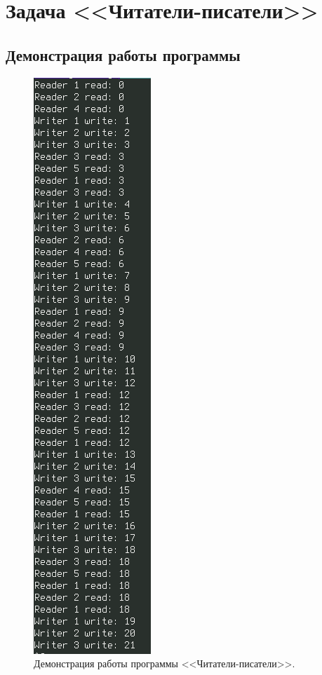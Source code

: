 \documentclass[12pt]{report}
\begin{document}
\chapter{Задача <<Читатели-писатели>>}

\section{Демонстрация работы программы}

\begin{figure}[H]
	\centering
	\includegraphics[scale=0.6]{img/read-write.png}
	\caption{Демонстрация работы программы <<Читатели-писатели>>.}
	\label{fig:task02}
\end{figure}
\end{document}
